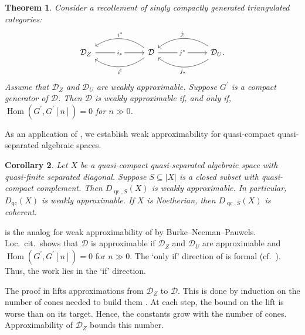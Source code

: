 \documentclass[11pt]{amsart}
\theoremstyle{plain}
\newtheorem{theorem}{Theorem}[section]
\newtheorem{corollary}[theorem]{Corollary}
\theoremstyle{definition}
\numberwithin{equation}{section}
\numberwithin{theorem}{section}
\begin{document}
\begin{theorem}
    \label{thm:glueing_weak_approx}
    Consider a recollement of singly compactly generated triangulated categories:
    \begin{displaymath}
        \begin{tikzcd}[column sep=6em]
            {\mathcal{D}_Z} & {\mathcal{D}} & {\mathcal{D}_U.}
            \arrow["{i_\ast}" description, from=1-1, to=1-2]
            \arrow["{i^\ast}"', bend right=35, from=1-2, to=1-1]
            \arrow["{i^!}", bend left=35, from=1-2, to=1-1]
            \arrow["{j^\ast}" description, from=1-2, to=1-3]
            \arrow["{j_!}"', bend right=35, from=1-3, to=1-2]
            \arrow["{j_\ast}", bend left=35, from=1-3, to=1-2]
        \end{tikzcd}
    \end{displaymath}
    Assume that $\mathcal{D}_Z$ and $\mathcal{D}_U$ are weakly approximable. Suppose $G^\prime$ is a compact generator of $\mathcal{D}$.
    Then $\mathcal{D}$ is weakly approximable if, and only if, $\operatorname{Hom}(G^\prime,G^\prime[n])=0$ for $n\gg 0$.
\end{theorem}

As an application of , we establish weak approximability for quasi-compact quasi-separated algebraic spaces.

\begin{corollary}
    \label{cor:weak_approx_spaces}
    Let $X$ be a quasi-compact quasi-separated algebraic space with quasi-finite separated diagonal.
    Suppose $S\subseteq |X|$ is a closed subset with quasi-compact complement.
    Then $D_{\operatorname{qc},S}(X)$ is weakly approximable. 
    In particular, $D_{\operatorname{qc}}(X)$ is weakly approximable.
    If $X$ is Noetherian, then $D_{\operatorname{qc},S}(X)$ is coherent.
\end{corollary}

 is the analog for weak approximability of \cite[Theorem 5.1]{Burke/Neeman/Pauwels:2023} by Burke--Neeman--Pauwels.
Loc.\ cit.\ shows that $\mathcal{D}$ is approximable if $\mathcal{D}_Z$ and $\mathcal{D}_U$ are approximable and $\operatorname{Hom}(G^\prime,G^\prime[n])=0$ for $n\gg 0$.
The `only if' direction of  is formal (cf.\ \cite[Remark 3]{Burke/Neeman/Pauwels:2023}).
Thus, the work lies in the `if' direction.

The proof in \cite{Burke/Neeman/Pauwels:2023} lifts approximations from $\mathcal{D}_Z$ to $\mathcal{D}$.
This is done by induction on the number of cones needed to build them \cite[Lemmas 5.2 to 5.5]{Burke/Neeman/Pauwels:2023}.
At each step, the bound on the lift is worse than on its target.
Hence, the constants grow with the number of cones.
Approximability of $\mathcal{D}_Z$ bounds this number.
\end{document}
